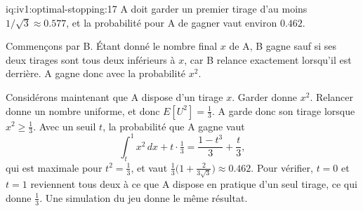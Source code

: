 \begin{solution}{iq:iv1:optimal-stopping:17}
A doit garder un premier tirage d'au moins $1/\sqrt{3} \approx 0.577$, et la probabilité pour A de gagner vaut environ $0.462$.

Commençons par B. Étant donné le nombre final $x$ de A, B gagne sauf si ses deux tirages sont tous deux inférieurs à $x$, car B relance exactement lorsqu'il est derrière. A gagne donc avec la probabilité $x^2$.

Considérons maintenant que A dispose d'un tirage $x$. Garder donne $x^2$. Relancer donne un nombre uniforme, et donc $E[U^2] = \tfrac13$. A garde donc son tirage lorsque $x^2 \ge \tfrac13$. Avec un seuil $t$, la probabilité que A gagne vaut
\[
\int_t^1 x^2\,dx + t \cdot \tfrac13 = \frac{1 - t^3}{3} + \frac{t}{3},
\]
qui est maximale pour $t^2 = \tfrac13$, et vaut $\tfrac13\bigl(1 + \tfrac{2}{3\sqrt{3}}\bigr) \approx 0.462$. Pour vérifier, $t = 0$ et $t = 1$ reviennent tous deux à ce que A dispose en pratique d'un seul tirage, ce qui donne $\tfrac13$. Une simulation du jeu donne le même résultat.

\end{solution}

